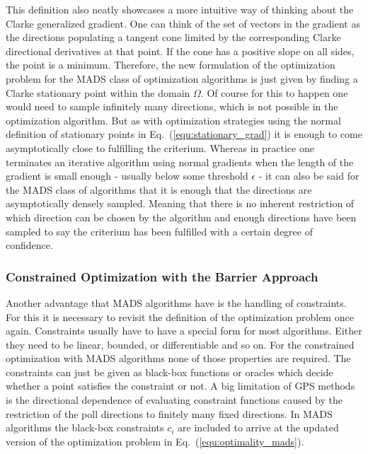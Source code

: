 \documentclass[a4paper,10pt]{article}
\newcommand{\equref}[1]{Eq.~(\ref{#1})}
\begin{document}
    This definition also neatly showcases a more intuitive way of thinking
    about the Clarke generalized gradient.
    One can think of the set of vectors in the gradient as the directions
    populating a tangent cone limited by the corresponding Clarke directional
    derivatives at that point.
    If the cone has a positive slope on all sides, the point is a minimum.
    Therefore, the new formulation of the optimization problem for
    the MADS class of optimization algorithms is just given by finding
    a Clarke stationary point within the domain $\Omega$.
    Of course for this to happen one would need to sample infinitely
    many directions, which is not possible in the optimization
    algorithm.
    But as with optimization strategies using the normal 
    definition of stationary points in \equref{equ:stationary_grad} it
    is enough to come asymptotically close to fulfilling the
    criterium.
    Whereas in practice one terminates an iterative algorithm using
    normal gradients when the length of the gradient is small
    enough - usually below some threshold $\epsilon$ - it can
    also be said for the MADS class of algorithms that it is
    enough that the directions are asymptotically densely
    sampled.
    Meaning that there is no inherent restriction of which direction
    can be chosen by the algorithm and enough directions have been sampled
    to say the criterium has been fulfilled with a certain degree of
    confidence. 

    \subsubsection{Constrained Optimization with the Barrier Approach} \label{sec:constrained}

    Another advantage that MADS algorithms have is the handling of
    constraints.
    For this it is necessary to revisit the definition of the optimization
    problem once again.
    Constraints usually have to have a special form for most algorithms.
    Either they need to be linear, bounded, or differentiable and so on.
    For the constrained optimization with MADS algorithms none of
    those properties are required.
    The constraints can just be given as black-box functions or
    oracles which decide whether a point satisfies the constraint
    or not.
    A big limitation of GPS methods is the directional dependence of
    evaluating constraint functions caused by the restriction of the poll
    directions to finitely many fixed directions.
    In MADS algorithms the black-box constraints $c_i$ are included to arrive
    at the updated version of the optimization problem in
    \equref{equ:optimality_mads}.
\end{document}
